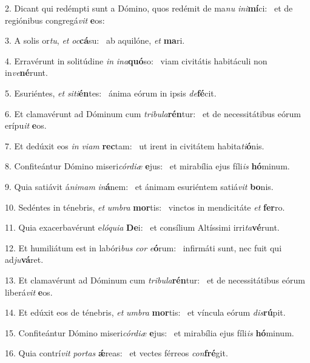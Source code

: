 2. Dicant qui redémpti sunt a Dómino, quos redémit de ma\textit{nu} \textit{in}\textit{i}\textbf{mí}ci: \ast\  et de regiónibus congregá\textit{vit} \textbf{e}os:\

3. A solis or\textit{tu}, \textit{et} \textit{oc}\textbf{cá}su: \ast\  ab aquilóne, \textit{et} \textbf{ma}ri.\

4. Erravérunt in solitúdine \textit{in} \textit{in}\textit{a}\textbf{quó}so: \ast\  viam civitátis habitáculi non in\textit{ve}\textbf{né}runt.\

5. Esuriéntes, \textit{et} \textit{si}\textit{ti}\textbf{én}tes: \ast\  ánima eórum in ipsis \textit{de}\textbf{fé}cit.\

6. Et clamavérunt ad Dóminum cum \textit{tri}\textit{bu}\textit{la}\textbf{rén}tur: \ast\  et de necessitátibus eórum erípu\textit{it} \textbf{e}os.\

7. Et dedúxit eos \textit{in} \textit{vi}\textit{am} \textbf{rec}tam: \ast\  ut irent in civitátem habita\textit{ti}\textbf{ó}nis.\

8. Confiteántur Dómino miseri\textit{cór}\textit{di}\textit{æ} \textbf{e}jus: \ast\  et mirabília ejus fíli\textit{is} \textbf{hó}minum.\

9. Quia satiávit á\textit{ni}\textit{mam} \textit{in}\textbf{á}nem: \ast\  et ánimam esuriéntem satiá\textit{vit} \textbf{bo}nis.\

10. Sedéntes in ténebris, \textit{et} \textit{um}\textit{bra} \textbf{mor}tis: \ast\  vinctos in mendicitáte \textit{et} \textbf{fer}ro.\

11. Quia exacerbavérunt e\textit{ló}\textit{qui}\textit{a} \textbf{De}i: \ast\  et consílium Altíssimi irri\textit{ta}\textbf{vé}runt.\

12. Et humiliátum est in labóri\textit{bus} \textit{cor} \textit{e}\textbf{ó}rum: \ast\  infirmáti sunt, nec fuit qui ad\textit{ju}\textbf{vá}ret.\

13. Et clamavérunt ad Dóminum cum \textit{tri}\textit{bu}\textit{la}\textbf{rén}tur: \ast\  et de necessitátibus eórum liberá\textit{vit} \textbf{e}os.\

14. Et edúxit eos de ténebris, \textit{et} \textit{um}\textit{bra} \textbf{mor}tis: \ast\  et víncula eórum \textit{dis}\textbf{rú}pit.\

15. Confiteántur Dómino miseri\textit{cór}\textit{di}\textit{æ} \textbf{e}jus: \ast\  et mirabília ejus fíli\textit{is} \textbf{hó}minum.\

16. Quia contrí\textit{vit} \textit{por}\textit{tas} \textbf{ǽ}reas: \ast\  et vectes férreos \textit{con}\textbf{fré}git.\

